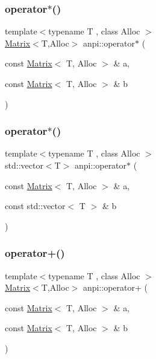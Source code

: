 \subsubsection{\texorpdfstring{operator$\ast$()}{operator*()}\hspace{0.1cm}{\footnotesize\ttfamily [1/2]}}
{\footnotesize\ttfamily template$<$typename T , class Alloc $>$ \\
\hyperlink{classanpi_1_1Matrix}{Matrix}$<$T,Alloc$>$ anpi\+::operator$\ast$ (\begin{DoxyParamCaption}\item[{const \hyperlink{classanpi_1_1Matrix}{Matrix}$<$ T, Alloc $>$ \&}]{a,  }\item[{const \hyperlink{classanpi_1_1Matrix}{Matrix}$<$ T, Alloc $>$ \&}]{b }\end{DoxyParamCaption})}

\mbox{\label{namespaceanpi_a1f9baeaf135f590f648d63c1a019670c}} 
\subsubsection{\texorpdfstring{operator$\ast$()}{operator*()}\hspace{0.1cm}{\footnotesize\ttfamily [2/2]}}
{\footnotesize\ttfamily template$<$typename T , class Alloc $>$ \\
std\+::vector$<$T$>$ anpi\+::operator$\ast$ (\begin{DoxyParamCaption}\item[{const \hyperlink{classanpi_1_1Matrix}{Matrix}$<$ T, Alloc $>$ \&}]{a,  }\item[{const std\+::vector$<$ T $>$ \&}]{b }\end{DoxyParamCaption})}

\mbox{\label{namespaceanpi_a423316157aca85d7aefff3fcee900a5e}} 
\subsubsection{\texorpdfstring{operator+()}{operator+()}}
{\footnotesize\ttfamily template$<$typename T , class Alloc $>$ \\
\hyperlink{classanpi_1_1Matrix}{Matrix}$<$T,Alloc$>$ anpi\+::operator+ (\begin{DoxyParamCaption}\item[{const \hyperlink{classanpi_1_1Matrix}{Matrix}$<$ T, Alloc $>$ \&}]{a,  }\item[{const \hyperlink{classanpi_1_1Matrix}{Matrix}$<$ T, Alloc $>$ \&}]{b }\end{DoxyParamCaption})}

